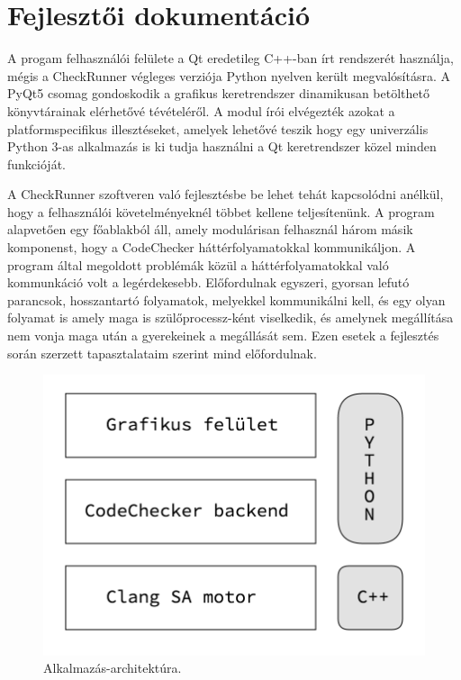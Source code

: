 \documentclass[a4paper,12pt]{report}
\begin{document}
\chapter{Fejlesztői dokumentáció}

A progam felhasználói felülete a Qt eredetileg C++-ban írt rendszerét használja, mégis a CheckRunner végleges verziója Python nyelven került megvalósításra. A PyQt5 csomag gondoskodik a grafikus keretrendszer dinamikusan betölthető könyvtárainak elérhetővé tévételéről. A modul írói elvégezték azokat a platformspecifikus illesztéseket, amelyek lehetővé teszik hogy egy univerzális Python 3-as alkalmazás is ki tudja használni a Qt keretrendszer közel minden funkcióját.

A CheckRunner szoftveren való fejlesztésbe be lehet tehát kapcsolódni anélkül, hogy a felhasználói követelményeknél többet kellene teljesítenünk. A program alapvetően egy főablakból áll, amely modulárisan felhasznál három másik komponenst, hogy a CodeChecker háttérfolyamatokkal kommunikáljon. A program által megoldott problémák közül a háttérfolyamatokkal való kommunkáció volt a legérdekesebb. Előfordulnak egyszeri, gyorsan lefutó parancsok, hosszantartó folyamatok, melyekkel kommunikálni kell, és egy olyan folyamat is amely maga is szülőprocessz-ként viselkedik, és amelynek megállítása nem vonja maga után a gyerekeinek a megállását sem. Ezen esetek a fejlesztés során szerzett tapasztalataim szerint mind előfordulnak.

\begin{figure}[h]
\caption{Alkalmazás-architektúra.}
\centering
\includegraphics[scale=0.4]{architektura.png}
\end{figure}
\end{document}
